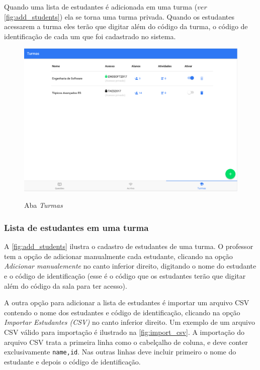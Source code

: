 Quando uma lista de estudantes é adicionada em uma turma ($ver$ \autoref{fig:add_students}) ela se
torna uma turma privada. Quando os estudantes acessarem a turma eles terão que
digitar além do código da turma, o código de identificação de cada um que foi cadastrado no sistema.

\begin{figure}[h]
  \centering
  \caption{Aba \textit{Turmas}}
  \includegraphics[scale=.4]{imagens/telas/admin_classes}
  \doautor
  \label{fig:admin_classes}
\end{figure}

\subsubsection{Lista de estudantes em uma turma}

A \autoref{fig:add_students} ilustra o cadastro de estudantes de uma turma.
O professor tem a opção de adicionar manualmente cada estudante, clicando
na opção \textit{Adicionar manualemente} no canto inferior direito, digitando
o nome do estudante e o código de identificação (esse é o código que os estudantes
terão que digitar além do código da sala para ter acesso).

A outra opção para adicionar a lista de estudantes é importar um arquivo CSV
contendo o nome dos estudantes e código de identificação, clicando
na opção \textit{Importar Estudantes (CSV)} no canto inferior direito. Um exemplo de um
arquivo CSV válido para importação é ilustrado na \autoref{fig:import_csv}.
A importação do arquivo CSV trata a primeira linha como o cabelçalho de coluna,
e deve conter exclusivamente \texttt{name,id}. Nas outras linhas deve incluir
primeiro o nome do estudante e depois o código de identificação.

